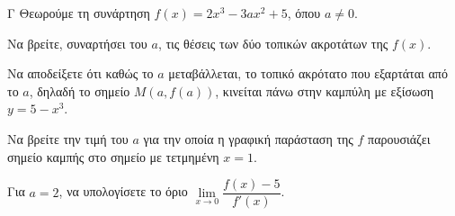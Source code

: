 \begin{thema}{Γ}
Θεωρούμε τη συνάρτηση $f(x) = 2x^3 - 3a x^2 + 5$, όπου $a \ne 0$.
\begin{erwthma}
  \item Να βρείτε, συναρτήσει του $a$, τις θέσεις των δύο τοπικών ακροτάτων της $f(x)$.
  \item Να αποδείξετε ότι καθώς το $a$ μεταβάλλεται, το τοπικό ακρότατο που εξαρτάται από το $a$, δηλαδή το σημείο $M(a, f(a))$, κινείται πάνω στην καμπύλη με εξίσωση $y = 5 - x^3$.
  \item Να βρείτε την τιμή του $a$ για την οποία η γραφική παράσταση της $f$ παρουσιάζει σημείο καμπής στο σημείο με τετμημένη $x=1$.
  \item Για $a = 2$, να υπολογίσετε το όριο $\lim\limits_{x \to 0} \dfrac{f(x) - 5}{f'(x)}$.
\end{erwthma}
\end{thema}
